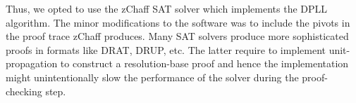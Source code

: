 Thus, we opted to use the zChaff SAT solver which implements the DPLL algorithm. 
The minor modifications to the software was to include the pivots 
in the proof trace zChaff produces. Many SAT solvers produce more sophisticated 
proofs in formats like DRAT, DRUP, etc. The latter require to implement unit-propagation
to construct a resolution-base proof and hence the implementation might unintentionally
slow the performance of the solver during the proof-checking step.

